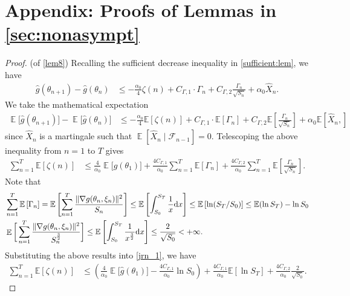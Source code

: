 \documentclass[standalone]{article}
\newcommand{\E}{\mathbb{E}}
\DeclareMathOperator{\Expect}{\mathbb{E}}
\begin{document}
\section{Appendix: Proofs of Lemmas in \cref{sec:nonasympt}}
\begin{proof}(of \cref{lem8})
Recalling the sufficient decrease inequality in \cref{sufficient:lem}, we have
\begin{align*}
\hat{g}(\theta_{n+1})-\hat{g}(\theta_{n}) & \le -\frac{\alpha_{0}}{4}\zeta(n)+C_{\Gamma,1}\cdot \Gamma_n  +C_{\Gamma,2}\frac{\Gamma_{n}}{\sqrt{S_{n}}} + \alpha_0 \hat{X}_{n}.
\end{align*}
We take the mathematical expectation
\begin{align}\label{12sqdr}
\Expect\big[\hat{g}(\theta_{n+1})\big]-\Expect\big[\hat{g}(\theta_{n})\big] &  \le -\frac{\alpha_{0}}{4}\E\left[\zeta(n)\right]+C_{\Gamma,1}\cdot \E\left[\Gamma_n \right]+C_{\Gamma,2}\E\left[\frac{\Gamma_{n}}{\sqrt{S_{n}}} \right] + \alpha_0 \E\left[\hat{X}_{n},
\right]\end{align}
since $\hat{X}_{n}$ is a martingale such that $\Expect\left[\hat{X}_{n} \mid \mathscr{F}_{n-1}\right] = 0$. Telescoping the above inequality from $n=1$ to $T$ gives
\begin{align}\label{jrn_1}
\sum_{n=1}^{T}\E\left[\zeta(n)\right] & \le \frac{4}{\alpha_0}\Expect\big[\hat{g}(\theta_{1})\big]+\frac{4C_{\Gamma,1}}{\alpha_0}\sum_{n=1}^{T}\E\left[\Gamma_n \right] + \frac{4C_{\Gamma,2}}{\alpha_0}\sum_{n=1}^{T}\E\left[\frac{\Gamma_{n}}{\sqrt{S_{n}}} \right].
\end{align}
Note that \begin{align}
& \sum_{n=1}^{T} \E\left[\Gamma_n \right]  =  \E\left[\sum_{n=1}^{T} \frac{\|\nabla g(\theta_{n},\xi_{n})\|^{2}}{S_{n}} \right] \leq \E\left[\int_{S_{0}}^{S_{T}}\frac{1}{x}\text{d}x \right]\leq \E\left[\ln (S_T/S_0)\right] \leq \E(\ln S_T) - \ln S_0 \notag \\
& \Expect\bigg[\sum_{n=1}^{T}\frac{\|\nabla g(\theta_{n},\xi_{n})\|^{2}}{S_{n}^{\frac{3}{2}}}\bigg] \leq \E\left[\int_{S_{0}}^{S_T} \frac{1}{x^{\frac{3}{2}}} \mathrm{d} x \right] \le \frac{2}{\sqrt{S_{0}}}<+\infty. \notag
\end{align}
Substituting the above results into \cref{jrn_1}, we have
\begin{align}\label{inqu:lem:v1:1}
\sum_{n=1}^{T}\E\left[\zeta(n)\right] & \le \left(\frac{4}{\alpha_0}\Expect\big[\hat{g}(\theta_{1})\big] -\frac{4C_{\Gamma,1}}{\alpha_0}\ln S_0  \right)+ \frac{4C_{\Gamma,1}}{\alpha_0}\E\left[\ln S_T \right] + \frac{4C_{\Gamma,2}}{\alpha_0}\frac{2}{\sqrt{S_0}}.

\end{align}
\end{proof}
\end{document}
